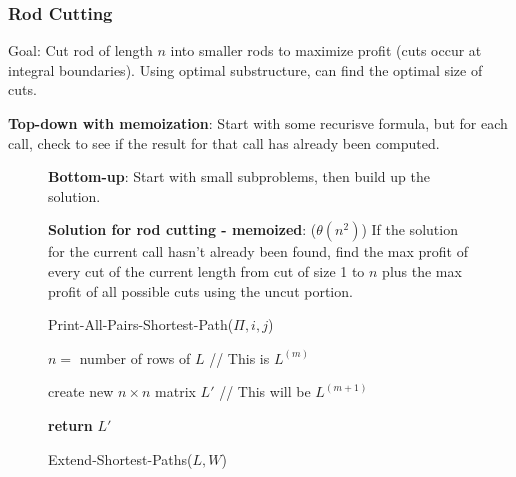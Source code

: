 \documentclass[7pt]{article}
\begin{document}
\begin{multicols*}{4}
\subsubsection*{Rod Cutting}
Goal: Cut rod of length $n$ into smaller rods to maximize profit (cuts
occur at integral boundaries).  Using optimal substructure, can find
the optimal size of cuts.

{\bf Top-down with memoization}: Start with some recurisve formula, but
for each call, check to see if the result for that call has already
been computed.
\end{multicols*}
\begin{figure*}[ttt!] %
  \begin{minipage}[t]{.25\linewidth}
    \vspace{0pt}
    
    {\bf Bottom-up}: Start with small subproblems, then build up the
    solution.
    
    {\bf Solution for rod cutting - memoized}: ($\theta(n^2)$) If the solution for the
    current call hasn't already been found, find the max profit of every
    cut of the current length from cut of size 1 to $n$ plus the max
    profit of all possible cuts using the uncut portion.   
    
    \begin{algorithm}[H]
      \caption{Print-All-Pairs-Shortest-Path($\Pi,i,j$)}
    \end{algorithm}
    
    \begin{algorithm}[H]
    \caption{Extend-Shortest-Paths($L,W$)}
      $n=$ number of rows of $L$  \hspace*{0.25in} // This is $L^{(m)}$ 

      create new $n \times n$ matrix $L'$ \hspace*{0.125in} // This will be
$L^{(m+1)}$ 

      {\bf return} $L'$ 
    \end{algorithm}


\end{minipage}
\end{figure*}
\end{document}
